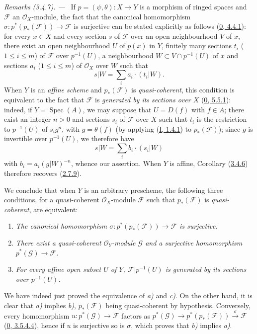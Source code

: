 \par\medskip\noindent\textit{Remarks (3.4.7). ---\ }
If $p=(\psi,\theta):X\to Y$ is a morphism of ringed spaces and
$\mathcal{F}$ an $\mathcal{O}_X$-module, the fact that the canonical homomorphism
$\sigma:p^*(p_*(\mathcal{F}))\to\mathcal{F}$ is surjective can be stated
explicitly as follows (\hyperref[0.4.4.1]{0, 4.4.1}): for every $x\in X$
and every section $s$ of $\mathcal{F}$ over an open neighbourhood $V$ of $x$,
there exist an open neighbourhood $U$ of $p(x)$ in $Y$, finitely many
sections $t_i$ ($1\leq i\leq m$) of $\mathcal{F}$ over $p^{-1}(U)$, a
neighbourhood $W\subset V\cap p^{-1}(U)$ of $x$ and sections $a_i$
($1\leq i\leq m$) of $\mathcal{O}_X$ over $W$ such that
\[
  s|W=\sum_i a_i\cdot(t_i|W).
\]
When $Y$ is an \emph{affine scheme} and $p_*(\mathcal{F})$ is
\emph{quasi-coherent}, this condition is equivalent to the fact that
$\mathcal{F}$ is \emph{generated by its sections over $X$}
(\hyperref[0.5.5.1]{0, 5.5.1}): indeed, if
$Y=\operatorname{Spec}(A)$, we may suppose that $U=D(f)$ with $f\in A$; there
exist an integer $n>0$ and sections $s_i$ of $\mathcal{F}$ over
$X$ such that $t_i$ is the restriction to $p^{-1}(U)$ of $s_ig^n$, with
$g=\theta(f)$ (by applying (\hyperref[I.1.4.1]{I, 1.4.1}) to
$p_*(\mathcal{F})$); since $g$ is invertible over $p^{-1}(U)$, we
therefore have
\[
  s|W=\sum_i b_i\cdot(s_i|W)
\]
with $b_i=a_i(g|W)^{-n}$, whence our assertion. When $Y$ is affine,
Corollary (\hyperref[II.3.4.6]{3.4.6}) therefore recovers
(\hyperref[II.2.7.9]{2.7.9}).


We conclude that when $Y$ is an arbitrary prescheme, the following three
conditions, for a quasi-coherent $\mathcal{O}_X$-module
$\mathcal{F}$ such that $p_*(\mathcal{F})$ is \emph{quasi-coherent}, are
equivalent:
\begin{enumerate}
  \item[a)] \emph{The canonical homomorphism
    $\sigma:p^*(p_*(\mathcal{F}))\to\mathcal{F}$ is surjective.}
  \item[b)] \emph{There exist a quasi-coherent $\mathcal{O}_Y$-module
    $\mathcal{G}$ and a surjective homomorphism
    $p^*(\mathcal{G})\to\mathcal{F}$.}
  \item[c)] \emph{For every affine open subset $U$ of $Y$,
    $\mathcal{F}|p^{-1}(U)$ is generated by its sections over
    $p^{-1}(U)$.}
\end{enumerate}
We have indeed just proved the equivalence of \emph{a)} and \emph{c)}. On the
other hand, it is clear that \emph{a)} implies \emph{b)}, $p_*(\mathcal{F})$
being quasi-coherent by hypothesis. Conversely, every homomorphism
$u:p^*(\mathcal{G})\to\mathcal{F}$ factors as
$p^*(\mathcal{G})\to p^*(p_*(\mathcal{F}))\xrightarrow{\sigma}\mathcal{F}$
(\hyperref[0.3.5.4.4]{0, 3.5.4.4}), hence if $u$ is surjective so is
$\sigma$, which proves that \emph{b)} implies \emph{a)}.

